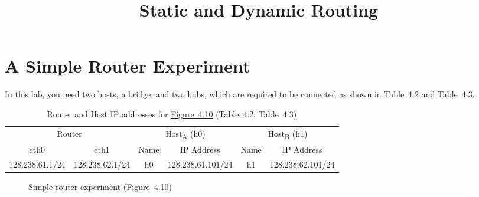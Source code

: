 \documentclass{../UTNetLab}
\title{Static and Dynamic Routing}
\begin{document}
\part{A Simple Router Experiment}
In this lab, you need two hosts, a bridge, and two hubs, which are required to be connected as shown in \hyperref[tab:4.2]{Table~4.2} and \hyperref[tab:4.3]{Table~4.3}.
    \begin{table}[H]
        \caption{Router and Host IP addresses for \hyperref[fig:4.10]{Figure~4.10} (Table~4.2\label{tab:4.2}, Table~4.3\label{tab:4.3})}
        \centering
        \begin{tabular}{ *2c | *2c | *2c }
            \hline \hline
            \multicolumn{2}{c|}{Router} & \multicolumn{2}{c|}{Host\textsubscript{A} (h0)} & \multicolumn{2}{c}{Host\textsubscript{B} (h1)} \\
            eth0 & eth1 & Name & IP Address & Name & IP Address \\
            \hline 
            128.238.61.1/24 & 128.238.62.1/24 & h0 & 128.238.61.101/24 & h1 & 128.238.62.101/24 \\
            \hline \hline
            \end{tabular}
    \end{table}

    \begin{figure}[H]
        \centering
        \caption{Simple router experiment (Figure~4.10)}\label{fig:4.10}
    \end{figure}
\end{document}
